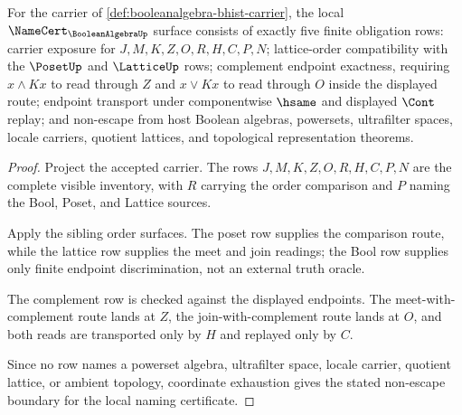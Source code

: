 \begin{theorem}
\label{thm:booleanalgebra-namecert-obligation-surface}
For the carrier of \autoref{def:booleanalgebra-bhist-carrier}, the local $\NameCert_{\BooleanAlgebraUp}$ surface consists of exactly five finite obligation rows: carrier exposure for $J,M,K,Z,O,R,H,C,P,N$; lattice-order compatibility with the $\PosetUp$ and $\LatticeUp$ rows; complement endpoint exactness, requiring $x \wedge Kx$ to read through $Z$ and $x \vee Kx$ to read through $O$ inside the displayed route; endpoint transport under componentwise $\hsame$ and displayed $\Cont$ replay; and non-escape from host Boolean algebras, powersets, ultrafilter spaces, locale carriers, quotient lattices, and topological representation theorems.
\end{theorem}
\begin{proof}
Project the accepted carrier. The rows $J,M,K,Z,O,R,H,C,P,N$ are the complete visible inventory, with $R$ carrying the order comparison and $P$ naming the Bool, Poset, and Lattice sources.

Apply the sibling order surfaces. The poset row supplies the comparison route, while the lattice row supplies the meet and join readings; the Bool row supplies only finite endpoint discrimination, not an external truth oracle.

The complement row is checked against the displayed endpoints. The meet-with-complement route lands at $Z$, the join-with-complement route lands at $O$, and both reads are transported only by $H$ and replayed only by $C$.

Since no row names a powerset algebra, ultrafilter space, locale carrier, quotient lattice, or ambient topology, coordinate exhaustion gives the stated non-escape boundary for the local naming certificate.
\end{proof}

